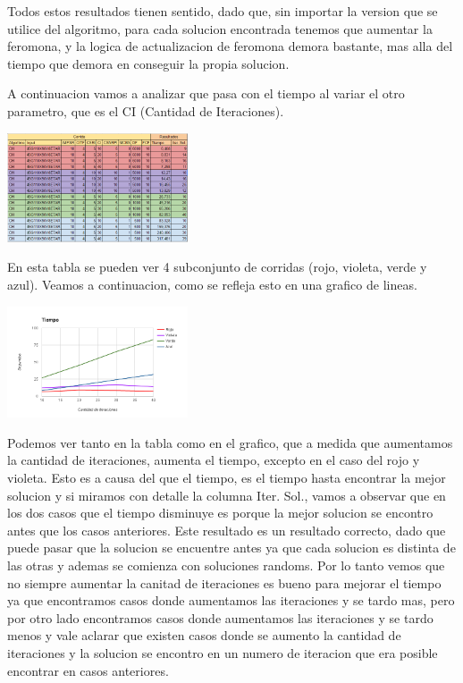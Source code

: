 Todos estos resultados tienen sentido, dado que, sin importar la version que se utilice del algoritmo, para cada solucion encontrada tenemos que aumentar la feromona, y la logica de actualizacion de feromona demora bastante, mas alla del tiempo que demora en conseguir la propia solucion. 

A continuacion vamos a analizar que pasa con el tiempo al variar el otro parametro, que es el CI (Cantidad de Iteraciones). 

\begin{center}
\includegraphics[width=0.4\textwidth]{imagenes/tabla3}
\end{center}

En esta tabla se pueden ver 4 subconjunto de corridas (rojo, violeta, verde y azul). Veamos a continuacion, como se refleja esto en una grafico de lineas.

\begin{center}
\includegraphics[width=0.4\textwidth]{imagenes/grafico1}
\end{center}

Podemos ver tanto en la tabla como en el grafico, que a medida que aumentamos la cantidad de iteraciones, aumenta el tiempo, excepto en el caso del rojo y violeta. Esto es a causa del que el tiempo, es el tiempo hasta encontrar la mejor solucion y si miramos con detalle la columna Iter. Sol., vamos a observar que en los dos casos que el tiempo disminuye es porque la mejor solucion se encontro antes que los casos anteriores. Este resultado es un resultado correcto, dado que puede pasar que la solucion se encuentre antes ya que cada solucion es distinta de las otras y ademas se comienza con soluciones randoms. 
Por lo tanto vemos que no siempre aumentar la canitad de iteraciones es bueno para mejorar el tiempo ya que encontramos casos donde aumentamos las iteraciones y se tardo mas, pero por otro lado encontramos casos donde aumentamos las iteraciones y se tardo menos y vale aclarar que existen casos donde se aumento la cantidad de iteraciones y la solucion se encontro en un numero de iteracion que era posible encontrar en casos anteriores.

